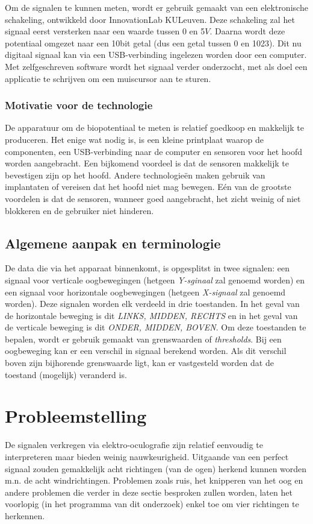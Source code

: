 \documentclass{article}
\begin{document}
Om de signalen te kunnen meten, wordt er gebruik gemaakt van een elektronische schakeling, ontwikkeld door InnovationLab KULeuven. Deze schakeling zal het signaal eerst versterken naar een waarde tussen 0 en 5$V$. Daarna wordt deze potentiaal omgezet naar een 10bit getal (dus een getal tussen 0 en 1023). Dit nu digitaal signaal kan via een USB-verbinding ingelezen worden door een computer. Met zelfgeschreven software wordt het signaal verder onderzocht, met als doel een applicatie te schrijven om een muiscursor aan te sturen.

\subsubsection{Motivatie voor de technologie}
De apparatuur om de biopotentiaal te meten is relatief goedkoop en makkelijk te produceren. Het enige wat nodig is, is een kleine printplaat waarop de componenten, een USB-verbinding naar de computer en sensoren voor het hoofd worden aangebracht.
Een bijkomend voordeel is dat de sensoren makkelijk te bevestigen zijn op het hoofd. Andere technologie\"en maken gebruik van implantaten of vereisen dat het hoofd niet mag bewegen. E\'en van de grootste voordelen is dat de sensoren, wanneer goed aangebracht, het zicht weinig of niet blokkeren en de gebruiker niet hinderen.

\subsection{Algemene aanpak en terminologie}
De data die via het apparaat binnenkomt, is opgesplitst in twee signalen: een signaal voor verticale oogbewegingen (hetgeen \textit{Y-sginaal} zal genoemd worden) en een signaal voor horizontale oogbewegingen (hetgeen \textit{X-signaal} zal genoemd worden). Deze signalen worden elk verdeeld in drie toestanden. In het geval van de horizontale beweging is dit \textit{LINKS, MIDDEN, RECHTS} en in het geval van de verticale beweging is dit \textit{ONDER, MIDDEN, BOVEN}. Om deze toestanden te bepalen, wordt er gebruik gemaakt van grenswaarden of \textit{thresholds}. Bij een oogbeweging kan er een verschil in signaal berekend worden. Als dit verschil boven zijn bijhorende grenswaarde ligt, kan er vastgesteld worden dat de toestand (mogelijk) veranderd is.
\section{Probleemstelling}
De signalen verkregen via elektro-oculografie zijn relatief eenvoudig te interpreteren maar bieden weinig nauwkeurigheid. Uitgaande van een perfect signaal zouden gemakkelijk acht richtingen (van de ogen) herkend kunnen worden m.n. de acht windrichtingen. Problemen zoals ruis, het knipperen van het oog en andere problemen die verder in deze sectie besproken zullen worden, laten het voorlopig (in het programma van dit onderzoek) enkel toe om vier richtingen te herkennen. 
\end{document}
